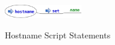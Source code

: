 \begin{figure}[htp]
\centering
\includegraphics[width=0.3\textwidth]{hostname_service_script}
\label{fig:hostname_script_statements}
\caption{Hostname Script Statements}
\end{figure}
